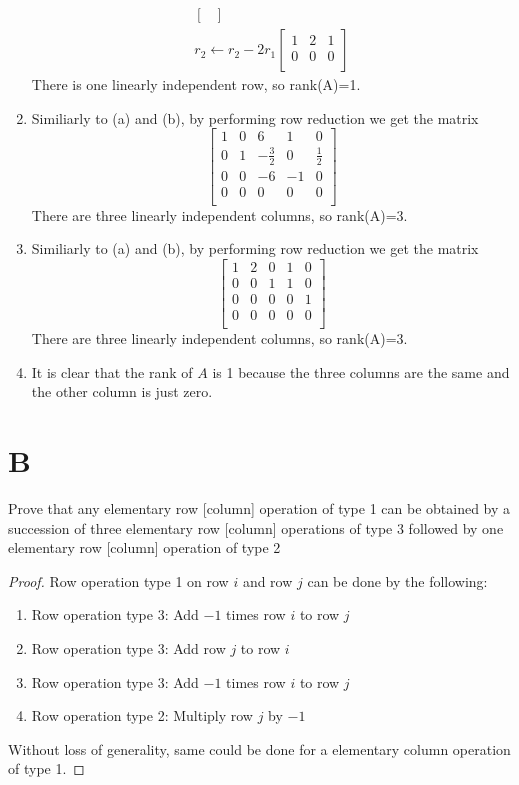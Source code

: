 \documentclass[11pt]{scrartcl}
\begin{document}
\begin{enumerate}[label=\alph*.]
{\begin{align*}
\begin{bmatrix}
			\end{bmatrix}\\
			r_2 \leftarrow r_2 - 2r_1
			\begin{bmatrix}
				1 & 2 & 1\\
				0 & 0 & 0\\
			\end{bmatrix}
		\end{align*}
		There is one linearly independent row, so rank(A)=1.
		}
	\item{
		Similiarly to (a) and (b), by performing row reduction we get the matrix
		\[
		\begin{bmatrix}
			1 & 0 & 6 & 1 & 0\\
			0 & 1 & -\frac32 & 0 & \frac12\\
			0 & 0 & -6 & -1 & 0\\
			0 & 0 & 0 & 0 & 0\\
		\end{bmatrix}
		\]
		There are three linearly independent columns, so rank(A)=3.
		}
	\item{
		Similiarly to (a) and (b), by performing row reduction we get the matrix
		\[
		\begin{bmatrix}
			1 & 2 & 0 & 1 & 0\\
			0 & 0 & 1 & 1 & 0\\
			0 & 0 & 0 & 0 & 1\\
			0 & 0 & 0 & 0 & 0\\
		\end{bmatrix}
		\]
		There are three linearly independent columns, so rank(A)=3.
	}
	\item{
		It is clear that the rank of $A$ is 1 because the three columns
		are the same and the other column is just zero. 
		}
\end{enumerate}

\section{B}
Prove that any elementary row [column] operation of type 1 can be obtained by a succession of three elementary
row [column] operations of type 3 followed by one elementary row [column] operation of type 2
\begin{proof}
Row operation type 1 on row $i$ and row $j$ can be done by the following:
\begin{enumerate}[label=\arabic*.]
	\item{
		Row operation type 3: Add $-1$ times row $i$ to row $j$ 
	}
	\item{
		Row operation type 3: Add row $j$ to row $i$
	}
	\item{
		Row operation type 3: Add $-1$ times row $i$ to row $j$
	}
	\item{
		Row operation type 2: Multiply row $j$ by $-1$
	}
\end{enumerate}
Without loss of generality, same could be done for a elementary column operation of type 1.
\end{proof}
\end{document}
